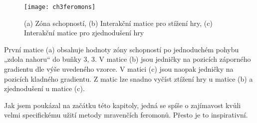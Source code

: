 \begin{figure}
  \centering
  \texttt{[image: ch3feromons]}
	\caption{(a) Zóna schopností, (b) Interakční matice pro stížení hry, (c) Interakční matice pro zjednodušení hry \cite{26poststroke} }
	\label{fig-ch3feromons}
\end{figure}

První matice (a) obsahuje hodnoty zóny schopností po jednoduchém pohybu „zdola nahoru“ do buňky 3, 3. V matice (b) jsou jedničky na pozicích záporného gradientu dle výše uvedeného vzorce. V matici (c) jsou naopak jedničky na pozicích kladného gradientu. Z matic lze snadno vyčíst ztížení hry u matice (b) a zjednodušení u matice (c).

Jak jsem poukázal na začátku této kapitoly, jedná se spíše o zajímavost kvůli velmi specifickému užití metody mravenčích feromonů. Přesto je to inspirativní.
